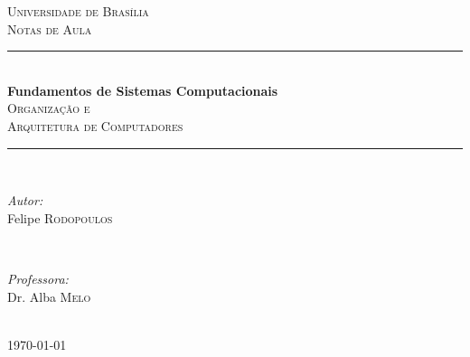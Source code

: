\documentclass[a4paper, 12pt, twoside]{book}
\newcommand{\HRule}{\rule{\linewidth}{0.5mm}}
\begin{document}
	\frontmatter

	\begin{titlepage}
		\thispagestyle{empty}
		\center

		\textsc{\LARGE Universidade de Brasília}\\[1.5cm] %
		\textsc{\Large Notas de Aula}\\[5cm] %

		\HRule \\[0.4cm]
		{\huge \bfseries Fundamentos de Sistemas Computacionais}\\[0.4cm]
		{\Large \textsc{Organização e\\Arquitetura de Computadores}}
		\HRule \\[6.5cm]

		\begin{minipage}{0.4\textwidth}
		\begin{flushleft} \large
		\emph{Autor:}\\
		Felipe \textsc{Rodopoulos} %
		\end{flushleft}
		\end{minipage}
		~
		\begin{minipage}{0.4\textwidth}
		\begin{flushright} \large
		\emph{Professora:} \\
		Dr. Alba \textsc{Melo} %
		\end{flushright}
		\end{minipage}\\[2cm]

		\vfill
		{\large \today}\\[2cm]
	\end{titlepage}








	\restoregeometry

	\tableofcontents

	\mainmatter
	
	
	
	
	
	\nocite{*}

\end{document}
